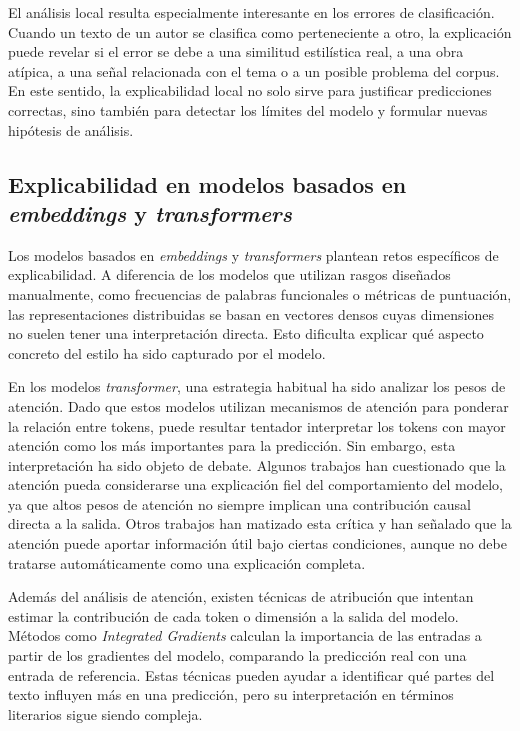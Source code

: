 \documentclass[IB]{TFUOC}%
\begin{document}
El análisis local resulta especialmente interesante en los errores de clasificación. Cuando un texto de un autor se clasifica como perteneciente a otro, la explicación puede revelar si el error se debe a una similitud estilística real, a una obra atípica, a una señal relacionada con el tema o a un posible problema del corpus. En este sentido, la explicabilidad local no solo sirve para justificar predicciones correctas, sino también para detectar los límites del modelo y formular nuevas hipótesis de análisis.

\subsection{Explicabilidad en modelos basados en \textit{embeddings} y \textit{transformers}}

Los modelos basados en \textit{embeddings} y \textit{transformers} plantean retos específicos de explicabilidad. A diferencia de los modelos que utilizan rasgos diseñados manualmente, como frecuencias de palabras funcionales o métricas de puntuación, las representaciones distribuidas se basan en vectores densos cuyas dimensiones no suelen tener una interpretación directa. Esto dificulta explicar qué aspecto concreto del estilo ha sido capturado por el modelo.

En los modelos \textit{transformer}, una estrategia habitual ha sido analizar los pesos de atención. Dado que estos modelos utilizan mecanismos de atención para ponderar la relación entre tokens, puede resultar tentador interpretar los tokens con mayor atención como los más importantes para la predicción. Sin embargo, esta interpretación ha sido objeto de debate. Algunos trabajos han cuestionado que la atención pueda considerarse una explicación fiel del comportamiento del modelo, ya que altos pesos de atención no siempre implican una contribución causal directa a la salida\cite{jain2019attention}. Otros trabajos han matizado esta crítica y han señalado que la atención puede aportar información útil bajo ciertas condiciones, aunque no debe tratarse automáticamente como una explicación completa\cite{wiegreffe2019attention}.

Además del análisis de atención, existen técnicas de atribución que intentan estimar la contribución de cada token o dimensión a la salida del modelo. Métodos como \textit{Integrated Gradients}\cite{sundararajan2017axiomatic} calculan la importancia de las entradas a partir de los gradientes del modelo, comparando la predicción real con una entrada de referencia. Estas técnicas pueden ayudar a identificar qué partes del texto influyen más en una predicción, pero su interpretación en términos literarios sigue siendo compleja.
\end{document}
